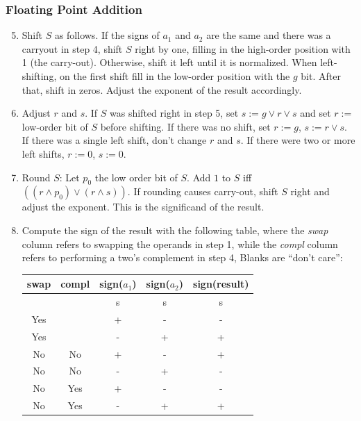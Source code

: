 \documentclass{beamer}
\begin{document}
\begin{frame}%
\frametitle{Floating Point Addition}

\scriptsize

\begin{enumerate}
\setcounter{enumi}{4}
\item Shift $S$ as follows. If the signs of $a_1$ and $a_2$ are the same and there was a carryout
  in step 4, shift $S$ right by one, filling in the high-order position with 1 (the carry-out).
  Otherwise, shift it left until it is normalized. When left-shifting, on the first
shift fill in the low-order position with the $g$ bit. After that, shift in zeros. Adjust
the exponent of the result accordingly.

\item Adjust $r$ and $s$. If $S$ was shifted right in step 5, set $s := g \vee r \vee s$ and set $r :=$ low-order bit of $S$ before
  shifting. If there was no shift, set $r := g$, $s := r \vee s$.
  If there was a single left shift, don't change $r$ and $s$. If there were two or more left
shifts, $r := 0$, $s := 0$.

\item Round $S$: Let $p_0$ the low order bit of $S$. Add $1$ to $S$ iff $((r \wedge p_0) \vee (r \wedge s))$.
  If rounding causes carry-out, shift $S$ right and adjust the exponent. This is the significand of the result.

\item Compute the sign of the result with the following table, where the \emph{swap} column refers to swapping the operands
  in step 1, while the \emph{compl} column refers to performing a two's complement in step 4, Blanks are ``don't care'':
  \tiny
  \begin{center}
  \begin{tabular}{|c|c|c|c|c|}
    \hline
    \textbf{swap} & \textbf{compl} & \textbf{sign($a_1$)} & \textbf{sign($a_2$)} & \textbf{sign(result)}\\
    \hline
        &     & s & s & s\\
    Yes &     & + & - & -\\
    Yes &     & - & + & +\\
    No  & No  & + & - & +\\
    No  & No  & - & + & -\\
    No  & Yes & + & - & -\\
    No  & Yes & - & + & +\\
    \hline
  \end{tabular}
  \end{center}
\end{enumerate}

\end{frame}
\end{document}

